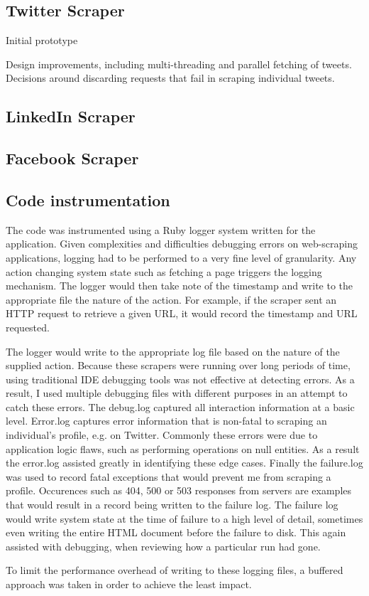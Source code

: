 
\subsection{Twitter Scraper}

Initial prototype

Design improvements, including multi-threading and parallel fetching of tweets. Decisions around discarding requests that fail in scraping individual tweets. 

\subsection{LinkedIn Scraper}

\subsection{Facebook Scraper}


\subsection{Code instrumentation}

The code was instrumented using a Ruby logger system written for the application. Given complexities and difficulties debugging errors on web-scraping applications, logging had to be performed to a very fine level of granularity. Any action changing system state such as fetching a page triggers the logging mechanism. The logger would then take note of the timestamp and write to the appropriate file the nature of the action. For example, if the scraper sent an HTTP request to retrieve a given URL, it would record the timestamp and URL requested. 

The logger would write to the appropriate log file based on the nature of the supplied action. Because these scrapers were running over long periods of time, using traditional IDE debugging tools was not effective at detecting errors. As a result, I used multiple debugging files with different purposes in an attempt to catch these errors. The debug.log captured all interaction information at a basic level. Error.log captures error information that is non-fatal to scraping an individual's profile, e.g. on Twitter. Commonly these errors were due to application logic flaws, such as performing operations on null entities. As a result the error.log assisted greatly in identifying these edge cases. Finally the failure.log was used to record fatal exceptions that would prevent me from scraping a profile. Occurences such as 404, 500 or 503 responses from servers are examples that would result in a record being written to the failure log. The failure log would write system state at the time of failure to a high level 
of detail, sometimes even writing the entire HTML document before the failure to disk. This again assisted with debugging, when reviewing how a particular run had gone. 

To limit the performance overhead of writing to these logging files, a buffered approach was taken in order to achieve the least impact. %
